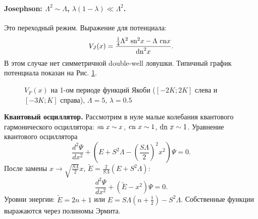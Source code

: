 \documentclass[12pt]{article}
\begin{document}
\paragraph{Josephson: $\Lambda^2 \sim \Lambda$, $\lambda(1 - \lambda) \ll \Lambda^2$.}
Это переходный режим.
Выражение для потенциала:
%
\begin{equation}
V_J(x) = \frac{\frac{1}{4} \Lambda^2 ~\textrm{sn}^2 x - \Lambda~\textrm{cn} x}{\textrm{dn}^2 x}.
\end{equation}
%
В этом случае нет симметричной double-well ловушки.
Типичный график потенциала показан на Рис. \ref{pic:potential_josephson}.
%
\begin{figure}[Ht!]
\caption{$V_F (x)$ на 1-ом периоде функций Якоби ($[-2K; 2K]$ слева и $[-3K; K]$ справа), $\Lambda = 5$, $\lambda = 0.5$}
\label{pic:potential_josephson}
\end{figure}
%

\textbf{Квантовый осциллятор.}
Рассмотрим в нуле малые колебания квантового гармонического осциллятора: $\textrm{sn}~x \sim x$, $\textrm{cn}~x \sim 1$, $\textrm{dn}~x \sim 1$.
Уравнение квантового осциллятора
%
\begin{equation}
\frac{d^2 \Psi}{dx^2} + (E + S^2 \Lambda - \left( \frac{S \Lambda}{2} \right)^2 x^2) \Psi = 0.
\end{equation}
%
После замены $x \to \sqrt{\frac{S \Lambda}{2}} x$, $\tilde{E} = \frac{2}{S \Lambda} (E + S^2 \Lambda)$:
%
\begin{equation}
\frac{d^2 \Psi}{dx^2} + (\tilde{E} - x^2) \Psi = 0.
\end{equation}
%
Уровни энергии: $\tilde{E} = 2n + 1$ или $E = S \Lambda (n + \frac{1}{2}) - S^2 \Lambda$.
Собственные функции выражаются через полиномы Эрмита.
\end{document}
